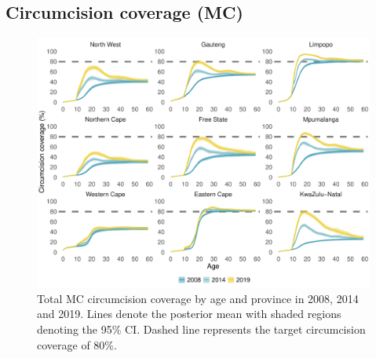 \documentclass{article}
\begin{document}
\begin{appendix}

\subsection{Circumcision coverage (MC)}


\begin{figure}[H]
	\centering
	\includegraphics[width = \linewidth]{Figures/suppmat/Coverage/MCcoverage_SingleAge_Province.pdf}
	\caption{Total MC circumcision coverage by age and province in 2008, 2014 and 2019. Lines denote the posterior mean with shaded regions denoting the 95\% CI. Dashed line represents the target circumcision coverage of 80\%.}
\end{figure}	



\end{appendix}
\end{document}
